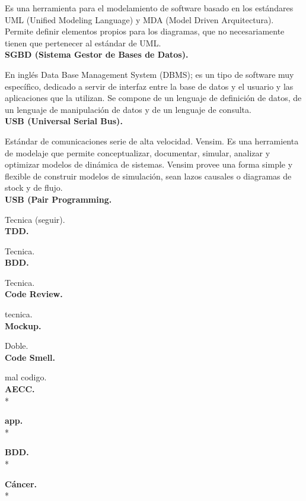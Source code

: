 \documentclass[../pfc.tex]{subfiles}
\begin{document}
	Es una herramienta para el modelamiento de software basado en los estándares UML
	(Unified Modeling Language) y MDA (Model Driven Arquitectura). Permite definir elementos
	propios para los diagramas, que no necesariamente tienen que pertenecer al estándar de UML.\\
	
	\textbf{SGBD (Sistema Gestor de Bases de Datos).}
	
	En inglés Data Base Management System (DBMS); es
	un tipo de software muy específico, dedicado a servir de interfaz entre la base de datos y el usuario
	y las aplicaciones que la utilizan. Se compone de un lenguaje de definición de datos, de un lenguaje
	de manipulación de datos y de un lenguaje de consulta.\\
	
	\textbf{USB (Universal Serial Bus).}
	
	Estándar de comunicaciones serie de alta velocidad.
	Vensim. Es una herramienta de modelaje que permite conceptualizar, documentar, simular,
	analizar y optimizar modelos de dinámica de sistemas. Vensim provee una forma simple y flexible
	de construir modelos de simulación, sean lazos causales o diagramas de stock y de flujo.\\
	
	\textbf{USB (Pair Programming.}
	
	Tecnica (seguir).\\
	
	\textbf{TDD.}
	
	Tecnica.\\
	
	\textbf{BDD.}
	
	Tecnica.\\
	
	\textbf{Code Review.}
	
	tecnica.\\
	
	\textbf{Mockup.}
	
	Doble.\\
	
	\textbf{Code Smell.}
	
	mal codigo.\\
	
		\textbf{AECC.}\\*
		
		\textbf{app.}\\*
		
		\textbf{BDD.}\\*
		
		\textbf{Cáncer.}	\\*
		
\end{document}
